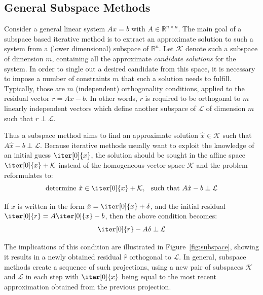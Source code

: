 \subsection{General Subspace Methods}
\label{sec:subspace_methods}

Consider a general linear system $Ax=b$ with $A \in \mathbb{R}^{n \times n}$. The main goal of a subspace based iterative method is to extract an approximate solution to such a system from a (lower dimensional) subspace of $\mathbb{R}^n$. Let $\mathcal{K}$ denote such a subspace of dimension $m$, containing all the approximate \textit{candidate solutions} for the system. In order to single out a desired candidate from this space, it is necessary to impose a number of constraints $m$ that such a solution needs to fulfill. Typically, those are $m$ (independent) orthogonality conditions, applied to the residual vector $r = Ax-b$. In other words, $r$ is required to be orthogonal to $m$ linearly independent vectors which define another subspace of $\mathcal{L}$ of dimension $m$ such that $r \perp \mathcal{L}$.

Thus a subspace method aims to find an approximate solution $\hat{x}\in \mathcal{K}$ such that $A\hat{x}-b \perp \mathcal{L}$. Because iterative methods usually want to exploit the knowledge of an initial guess $\iter[0]{x}$, the solution should be sought in the affine space $\iter[0]{x}+\mathcal{K}$ instead of the homogeneous vector space $\mathcal{K}$ \cite{saad_iterative_2003} and the problem reformulates to:
\begin{equation}
    \text{determine } \hat{x} \in \iter[0]{x}+\mathcal{K}\text{,}\;\;\text{  such that } A\hat{x}-b \perp \mathcal{L}
\end{equation}

\noindent If $\hat{x}$ is written in the form $\hat{x}=\iter[0]{x}+\delta$, and the initial residual $\iter[0]{r} = A\iter[0]{x}-b$, then the above condition becomes:
\begin{equation}
    \iter[0]{r} - A\delta \perp \mathcal{L}
\end{equation}

\noindent The implications of this condition are illustrated in Figure~\hyperref[fig:subspace]{\ref{fig:subspace}}, showing it results in a  newly obtained residual $\hat{r}$ orthogonal to $\mathcal{L}$. In general, subspace methods create a sequence of such projections, using a new pair of subspaces $\mathcal{K}$ and $\mathcal{L}$ in each step with $\iter[0]{x}$ being equal to the most recent approximation obtained from the previous projection.


